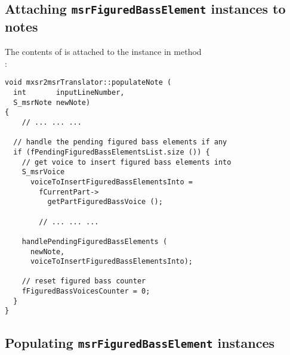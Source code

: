 \subsection{Attaching {\tt msrFiguredBassElement} instances to notes}

The contents of  is attached to the  instance in method\\
:
\begin{lstlisting}[language=CPlusPlus]
void mxsr2msrTranslator::populateNote (
  int       inputLineNumber,
  S_msrNote newNote)
{
	// ... ... ...

  // handle the pending figured bass elements if any
  if (fPendingFiguredBassElementsList.size ()) {
    // get voice to insert figured bass elements into
    S_msrVoice
      voiceToInsertFiguredBassElementsInto =
        fCurrentPart->
          getPartFiguredBassVoice ();

		// ... ... ...

    handlePendingFiguredBassElements (
      newNote,
      voiceToInsertFiguredBassElementsInto);

    // reset figured bass counter
    fFiguredBassVoicesCounter = 0;
  }
}
\end{lstlisting}


\subsection{Populating {\tt msrFiguredBassElement} instances}


